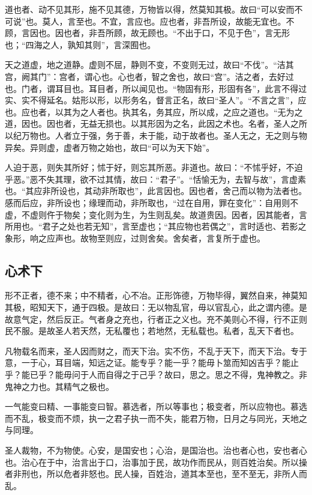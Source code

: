 道也者、动不见其形，施不见其德，万物皆以得，然莫知其极。故曰“可以安而不可说”也。莫人，言至也。不宜，言应也。应也者，非吾所设，故能无宜也。不顾，言因也。因也者，非吾所顾，故无顾也。“不出于口，不见于色”，言无形也；“四海之人，孰知其则”，言深囿也。

天之道虚，地之道静。虚则不屈，静则不变，不变则无过，故曰“不伐”。“洁其宫，阙其门”：宫者，谓心也。心也者，智之舍也，故曰“宫”。洁之者，去好过也。门者，谓耳目也。耳目者，所以闻见也。“物固有形，形固有各”，此言不得过实、实不得延名。姑形以形，以形务名，督言正名，故曰“圣人”。“不言之言”，应也。应也者，以其为之人者也。执其名，务其应，所以成，之应之道也。“无为之道，因也。因也者，无益无损也。以其形因为之名，此因之术也。名者，圣人之所以纪万物也。人者立于强，务于善，未于能，动于故者也。圣人无之，无之则与物异矣。异则虚，虚者万物之始也，故曰“可以为天下始”。

人迫于恶，则失其所好；怵于好，则忘其所恶。非道也。故曰：“不怵乎好，不迫乎恶。”恶不失其理，欲不过其情，故曰：“君子”。“恬愉无为，去智与故”，言虚素也。“其应非所设也，其动非所取也”，此言因也。因也者，舍己而以物为法者也。感而后应，非所设也；缘理而动，非所取也，“过在自用，罪在变化”：自用则不虚，不虚则仵于物矣；变化则为生，为生则乱矣。故道贵因。因者，因其能者，言所用也。“君子之处也若无知”，言至虚也；“其应物也若偶之”，言时适也、若影之象形，响之应声也。故物至则应，过则舍矣。舍矣者，言复所于虚也。

\subsection{心术下}

形不正者，德不来；中不精者，心不冶。正形饰德，万物毕得，翼然自来，神莫知其极，昭知天下，通于四极。是故曰：无以物乱官，毋以官乱心，此之谓内德。是故意气定，然后反正。气者身之充也，行者正之义也。充不美则心不得，行不正则民不服。是故圣人若天然，无私覆也；若地然，无私载也。私者，乱天下者也。

凡物载名而来，圣人因而财之，而天下治。实不伤，不乱于天下，而天下治。专于意，一于心，耳目端，知远之证。能专乎？能一乎？能毋卜筮而知凶吉乎？能止乎？能已乎？能毋问于人而自得之于己乎？故曰，思之。思之不得，鬼神教之。非鬼神之力也。其精气之极也。

一气能变曰精、一事能变曰智。慕选者，所以等事也；极变者，所以应物也。慕选而不乱，极变而不烦，执一之君子执一而不失，能君万物，日月之与同光，天地之与同理。

圣人裁物，不为物使。心安，是国安也；心治，是国治也。治也者心也，安也者心也。治心在于中，治言出于口，治事加于民，故功作而民从，则百姓治矣。所以操者非刑也，所以危者非怒也。民人操，百姓治，道其本至也，至不至无，非所人而乱。

